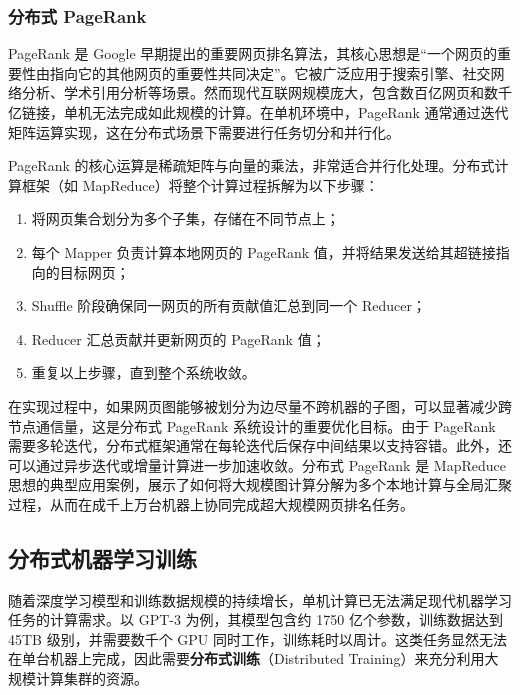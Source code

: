 \documentclass[lang=cn,newtx,10pt,scheme=chinese,chinesefont=nofont,citestyle=gb7714-2015, bibstyle=gb7714-2015]{elegantbook}
\begin{document}
\begin{refsection}
\subsubsection{分布式 PageRank}

PageRank 是 Google 早期提出的重要网页排名算法\cite{page1999pagerank}，其核心思想是“一个网页的重要性由指向它的其他网页的重要性共同决定”。它被广泛应用于搜索引擎、社交网络分析、学术引用分析等场景。然而现代互联网规模庞大，包含数百亿网页和数千亿链接，单机无法完成如此规模的计算。在单机环境中，PageRank 通常通过迭代矩阵运算实现，这在分布式场景下需要进行任务切分和并行化。

PageRank 的核心运算是稀疏矩阵与向量的乘法，非常适合并行化处理。分布式计算框架（如 MapReduce）将整个计算过程拆解为以下步骤：
\begin{enumerate}
    \item 将网页集合划分为多个子集，存储在不同节点上；
    \item 每个 Mapper 负责计算本地网页的 PageRank 值，并将结果发送给其超链接指向的目标网页；
    \item Shuffle 阶段确保同一网页的所有贡献值汇总到同一个 Reducer；
    \item Reducer 汇总贡献并更新网页的 PageRank 值；
    \item 重复以上步骤，直到整个系统收敛。
\end{enumerate}

在实现过程中，如果网页图能够被划分为边尽量不跨机器的子图，可以显著减少跨节点通信量，这是分布式 PageRank 系统设计的重要优化目标。由于 PageRank 需要多轮迭代，分布式框架通常在每轮迭代后保存中间结果以支持容错。此外，还可以通过异步迭代或增量计算进一步加速收敛。分布式 PageRank 是 MapReduce 思想的典型应用案例，展示了如何将大规模图计算分解为多个本地计算与全局汇聚过程，从而在成千上万台机器上协同完成超大规模网页排名任务。



\subsection{分布式机器学习训练}

随着深度学习模型和训练数据规模的持续增长，单机计算已无法满足现代机器学习任务的计算需求。以 GPT-3 为例，其模型包含约 1750 亿个参数，训练数据达到 45TB 级别，并需要数千个 GPU 同时工作，训练耗时以周计。这类任务显然无法在单台机器上完成，因此需要\textbf{分布式训练}（Distributed Training）来充分利用大规模计算集群的资源。


\end{refsection}
\end{document}
